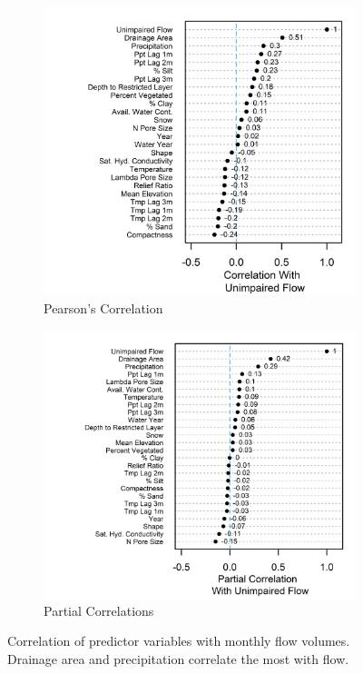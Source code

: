 \begin{figure}
	\centering
	\begin{subfigure}{.5\textwidth}
  		\centering
 		 \includegraphics[width=\textwidth, trim={0 0 0 0}, clip=true]{plots/rplot08_corrwithflow.png}
  		\caption{Pearson's Correlation}
  		\label{fig:sub1}
	\end{subfigure}%
	\begin{subfigure}{.5\textwidth}
  		\centering
  		\includegraphics[width=\textwidth, trim={0 0 0 0}, clip=true]{plots/rplot08_partialcorrwithflow.png}
  		\caption{Partial Correlations}
  		\label{fig:sub2}
	\end{subfigure}
	\caption{Correlation of predictor variables with monthly flow volumes. Drainage area and precipitation correlate the most with flow.}
	\label{fig:correlogram}
\end{figure}

